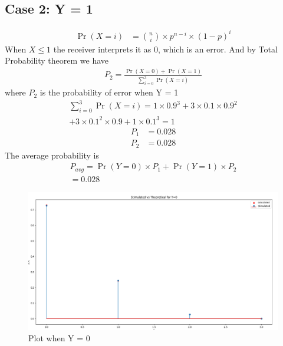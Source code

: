 \documentclass[journal,12pt,twocolumn]{IEEEtran}
\begin{document}
\subsection*{Case 2: Y = 1}
\begin{align}
\Pr(X = i) &= \binom{n}{i}\times p^{n-i}\times (1-p)^i
\end{align}
When $X \leq 1 $ the receiver interprets it as 0, which is an error. And by Total Probability theorem we have
\begin{align}
P_2 = \frac{\Pr(X = 0) + \Pr(X = 1)}{\sum_{i=0}^3\Pr(X = i)}
\end{align}
where $P_2$ is the probability of error when Y = 1
\begin{multline}
\sum_{i=0}^3\Pr(X = i) = 1\times 0.9^3 + 3\times 0.1\times 0.9^2 \\
+ 3\times 0.1^2 \times 0.9 + 1\times 0.1^3 = 1
\end{multline}
\begin{align}
P_1 &= 0.028\\
P_2 &= 0.028
\end{align}
The average probability is 
\begin{multline}
P_{avg} = \Pr(Y = 0)\times P_1 +\Pr(Y = 1)\times P_2\\ = 0.028 \end{multline}
\begin{table}[H]
\centering
{}
\caption{Probability of number of 1's recieved  }
\label{table:1}
\end{table}
\begin{figure}[H]
    \centering
    \includegraphics[width=\columnwidth]{assignment2_plot1}
    \caption{Plot when Y = 0}
    \label{fig:2}
\end{figure}
\end{document}
